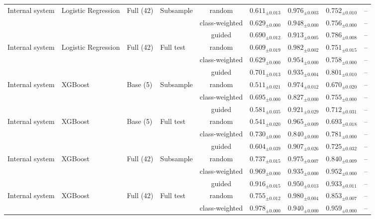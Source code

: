 \begin{longtable}{llllcccc}
\addlinespace
Internal system & Logistic Regression & Full (42) & Subsample & random & $0.611_{\pm 0.013}$ & $0.976_{\pm 0.003}$ & $0.752_{\pm 0.010}$ & -- \\
 &  &  &  & class-weighted & $0.629_{\pm 0.000}$ & $0.948_{\pm 0.000}$ & $0.756_{\pm 0.000}$ & -- \\
 &  &  &  & guided & $0.690_{\pm 0.012}$ & $0.913_{\pm 0.005}$ & $0.786_{\pm 0.008}$ & -- \\
\addlinespace
Internal system & Logistic Regression & Full (42) & Full test & random & $0.609_{\pm 0.019}$ & $0.982_{\pm 0.002}$ & $0.751_{\pm 0.015}$ & -- \\
 &  &  &  & class-weighted & $0.629_{\pm 0.000}$ & $0.954_{\pm 0.000}$ & $0.758_{\pm 0.000}$ & -- \\
 &  &  &  & guided & $0.701_{\pm 0.013}$ & $0.935_{\pm 0.004}$ & $0.801_{\pm 0.010}$ & -- \\
\addlinespace
Internal system & XGBoost & Base (5) & Subsample & random & $0.511_{\pm 0.021}$ & $0.974_{\pm 0.012}$ & $0.670_{\pm 0.020}$ & -- \\
 &  &  &  & class-weighted & $0.695_{\pm 0.000}$ & $0.827_{\pm 0.000}$ & $0.755_{\pm 0.000}$ & -- \\
 &  &  &  & guided & $0.581_{\pm 0.035}$ & $0.921_{\pm 0.029}$ & $0.712_{\pm 0.031}$ & -- \\
\addlinespace
Internal system & XGBoost & Base (5) & Full test & random & $0.541_{\pm 0.020}$ & $0.965_{\pm 0.009}$ & $0.693_{\pm 0.018}$ & -- \\
 &  &  &  & class-weighted & $0.730_{\pm 0.000}$ & $0.840_{\pm 0.000}$ & $0.781_{\pm 0.000}$ & -- \\
 &  &  &  & guided & $0.604_{\pm 0.039}$ & $0.907_{\pm 0.026}$ & $0.725_{\pm 0.032}$ & -- \\
\addlinespace
Internal system & XGBoost & Full (42) & Subsample & random & $0.737_{\pm 0.015}$ & $0.975_{\pm 0.007}$ & $0.840_{\pm 0.009}$ & -- \\
 &  &  &  & class-weighted & $0.969_{\pm 0.000}$ & $0.935_{\pm 0.000}$ & $0.952_{\pm 0.000}$ & -- \\
 &  &  &  & guided & $0.916_{\pm 0.015}$ & $0.950_{\pm 0.013}$ & $0.933_{\pm 0.011}$ & -- \\
\addlinespace
Internal system & XGBoost & Full (42) & Full test & random & $0.755_{\pm 0.012}$ & $0.980_{\pm 0.004}$ & $0.853_{\pm 0.007}$ & -- \\
 &  &  &  & class-weighted & $0.978_{\pm 0.000}$ & $0.940_{\pm 0.000}$ & $0.959_{\pm 0.000}$ & -- \\

\end{longtable}
